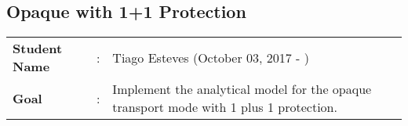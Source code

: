 \clearpage

\subsection{Opaque with 1+1 Protection}\label{analytical_Opaque_Protection}
\begin{tcolorbox}	
\begin{tabular}{p{2.75cm} p{0.2cm} p{10.5cm}} 	
\textbf{Student Name}  &:& Tiago Esteves    (October 03, 2017 - )\\
\textbf{Goal}          &:& Implement the analytical model for the opaque transport mode with 1 plus 1 protection.
\end{tabular}
\end{tcolorbox}
\vspace{11pt}

